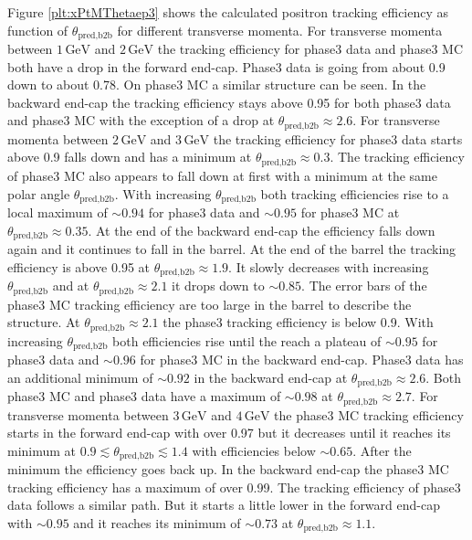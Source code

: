 \documentclass[a4paper,11pt,twosided,final,german,openbib,pdftex,listof=totoc,bibliography=totoc]{scrbook}
\begin{document}
Figure \ref{plt:xPtMThetaep3} shows the calculated positron tracking efficiency as function of $\theta_{\textrm{pred,b2b}}$ for different transverse momenta.
For transverse momenta between $1\,\textrm{GeV}$ and $2\,\textrm{GeV}$ the tracking efficiency for phase3 data and phase3 MC both have a drop in the forward end-cap. Phase3 data is going from about 0.9 down to about 0.78. On phase3 MC a similar structure can be seen. In the backward end-cap the tracking efficiency stays above 0.95 for both phase3 data and phase3 MC with the exception of a drop at $\theta_{\textrm{pred,b2b}} \approx 2.6$.
For transverse momenta between $2\,\textrm{GeV}$ and $3\,\textrm{GeV}$ the tracking efficiency for phase3 data starts above 0.9 falls down and has a minimum at $\theta_{\textrm{pred,b2b}} \approx 0.3$. The tracking efficiency of phase3 MC also appears to fall down at first with a minimum at the same polar angle $\theta_{\textrm{pred,b2b}}$. With increasing $\theta_{\textrm{pred,b2b}}$ both tracking efficiencies rise to a local maximum of $\sim 0.94$ for phase3 data and $\sim 0.95$ for phase3 MC at $\theta_{\textrm{pred,b2b}} \approx 0.35$. At the end of the backward end-cap the efficiency falls down again and it continues to fall in the barrel. At the end of the barrel the tracking efficiency is above 0.95 at $\theta_{\textrm{pred,b2b}} \approx 1.9$. It slowly decreases with increasing $\theta_{\textrm{pred,b2b}}$ and at $\theta_{\textrm{pred,b2b}} \approx 2.1$ it drops down to $\sim 0.85$. The error bars of the phase3 MC tracking efficiency are too large in the barrel to describe the structure. At $\theta_{\textrm{pred,b2b}} \approx 2.1$ the phase3 tracking efficiency is below 0.9. With increasing $\theta_{\textrm{pred,b2b}}$ both efficiencies rise until the reach a plateau of $\sim 0.95$ for phase3 data and $\sim 0.96$ for phase3 MC in the backward end-cap. Phase3 data has an additional minimum of $\sim 0.92$ in the backward end-cap at $\theta_{\textrm{pred,b2b}} \approx 2.6$. Both phase3 MC and phase3 data have a maximum of $\sim 0.98$ at $\theta_{\textrm{pred,b2b}} \approx 2.7$.
For transverse momenta between $3\,\textrm{GeV}$ and $4\,\textrm{GeV}$ the phase3 MC tracking efficiency starts in the forward end-cap with over 0.97 but it decreases until it reaches its minimum at $0.9 \lesssim \theta_{\textrm{pred,b2b}} \lesssim 1.4$ with efficiencies below $\sim 0.65$. After the minimum the efficiency goes back up. In the backward end-cap the phase3 MC tracking efficiency has a maximum of over 0.99. The tracking efficiency of phase3 data follows a similar path. But it starts a little lower in the forward end-cap with $\sim 0.95$ and it reaches its minimum of $\sim 0.73$ at $\theta_{\textrm{pred,b2b}} \approx 1.1$.
\end{document}
